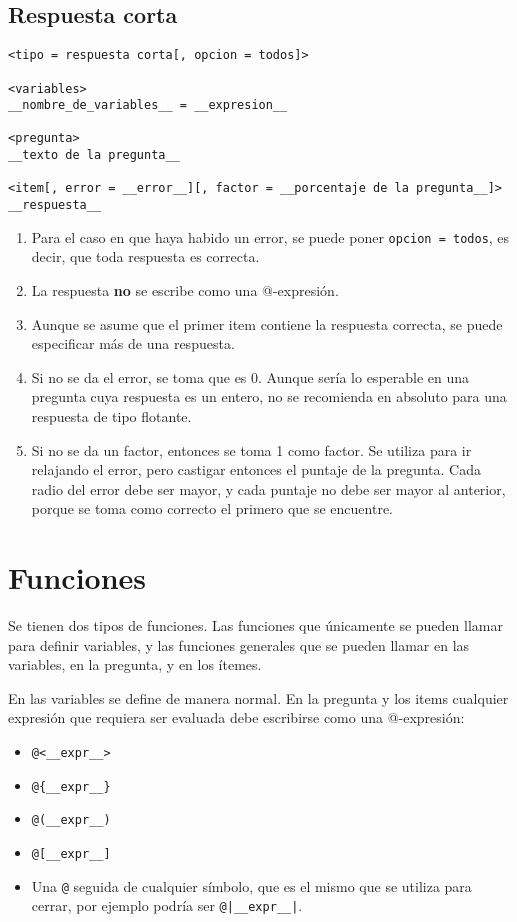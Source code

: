 \documentclass[12pt]{article}
\theoremstyle{definition}
\begin{document}
\subsection{Respuesta corta}

\begin{verbatim}
<tipo = respuesta corta[, opcion = todos]>

<variables>
__nombre_de_variables__ = __expresion__

<pregunta>
__texto de la pregunta__

<item[, error = __error__][, factor = __porcentaje de la pregunta__]>
__respuesta__
\end{verbatim}

\begin{enumerate}
  \item Para el caso en que haya habido un error, se puede poner \verb|opcion = todos|, es decir, que toda respuesta es correcta.
  \item La respuesta \textbf{no} se escribe como una @-expresión.
  \item Aunque se asume que el primer item contiene la respuesta correcta, se puede especificar más de una respuesta.  
  \item Si no se da el error, se toma que es 0. Aunque sería lo esperable en una pregunta cuya respuesta es un entero, no se recomienda en absoluto para una respuesta de tipo flotante. 
  \item Si no se da un factor, entonces se toma 1 como factor. Se utiliza para ir relajando el error, pero castigar entonces el puntaje de la pregunta. Cada radio del error debe ser mayor, y cada puntaje no debe ser mayor al anterior, porque se toma como correcto el primero que se encuentre.
\end{enumerate}

\section{Funciones}

Se tienen dos tipos de funciones. Las funciones que únicamente se pueden llamar para definir variables, y las funciones generales que se pueden llamar en las variables, en la pregunta, y en los ítemes.

En las variables se define de manera normal. En la pregunta y los items cualquier expresión que requiera ser evaluada debe escribirse como una @-expresión:
\begin{itemize}
  \item \verb|@<__expr__>|
  \item \verb|@{__expr__}|
  \item \verb|@(__expr__)|
  \item \verb|@[__expr__]|
  \item Una \verb|@| seguida de cualquier símbolo, que es el mismo que se utiliza para cerrar, por ejemplo podría ser \verb/@|__expr__|/. 
\end{itemize}
\end{document}
